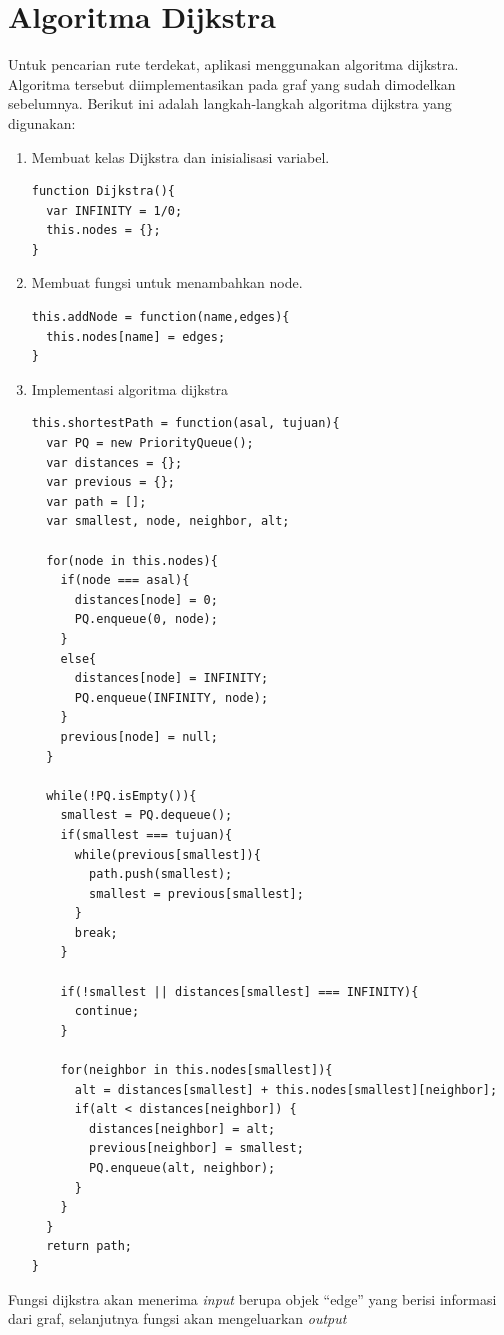 \section{Algoritma Dijkstra}
Untuk pencarian rute terdekat, aplikasi menggunakan algoritma dijkstra.
Algoritma tersebut diimplementasikan pada graf yang sudah dimodelkan
sebelumnya. Berikut ini adalah langkah-langkah algoritma dijkstra yang
digunakan:
\begin{enumerate}
  \item Membuat kelas Dijkstra dan inisialisasi variabel.
\begin{verbatim}
function Dijkstra(){
  var INFINITY = 1/0;
  this.nodes = {};
}
\end{verbatim}

  \item Membuat fungsi untuk menambahkan node. 
\begin{verbatim}
this.addNode = function(name,edges){
  this.nodes[name] = edges;
}
\end{verbatim}

  \item Implementasi algoritma dijkstra
\begin{verbatim}
this.shortestPath = function(asal, tujuan){
  var PQ = new PriorityQueue();
  var distances = {};
  var previous = {};
  var path = [];
  var smallest, node, neighbor, alt;

  for(node in this.nodes){
    if(node === asal){
      distances[node] = 0;
      PQ.enqueue(0, node);
    }
    else{
      distances[node] = INFINITY;
      PQ.enqueue(INFINITY, node);
    }
    previous[node] = null;
  }

  while(!PQ.isEmpty()){
    smallest = PQ.dequeue();
    if(smallest === tujuan){
      while(previous[smallest]){
        path.push(smallest);
        smallest = previous[smallest];
      }
      break;
    }

    if(!smallest || distances[smallest] === INFINITY){
      continue;
    }

    for(neighbor in this.nodes[smallest]){
      alt = distances[smallest] + this.nodes[smallest][neighbor];
      if(alt < distances[neighbor]) {
        distances[neighbor] = alt;
        previous[neighbor] = smallest;
        PQ.enqueue(alt, neighbor);
      }
    }
  }
  return path;
}
\end{verbatim}
\end{enumerate}
Fungsi dijkstra akan menerima \textit{input} berupa objek ``edge'' yang berisi
informasi dari graf, selanjutnya fungsi akan mengeluarkan \textit{output}
